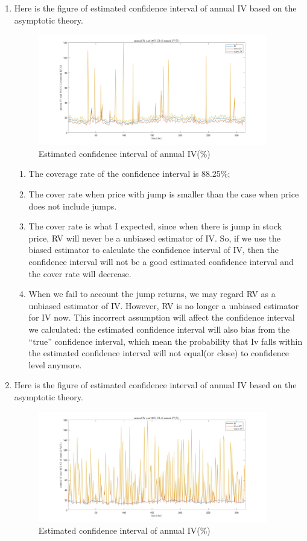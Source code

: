 \documentclass[12pt,letterpaper]{article}
\begin{document}
\begin{enumerate}[label=\textbf{(\Alph*)}]
\item Here is the figure of estimated confidence interval of annual IV based on the asymptotic theory.
\begin{figure}[H]
            \centering
            \includegraphics[width=10cm]{figures/p3_ex3_h.jpg}
            \caption{Estimated confidence interval of annual IV(\%)}
        \end{figure}
\begin{enumerate}[label=(\roman*)]
    \item The coverage rate of the confidence interval is 88.25\%;
    \item The cover rate when price with jump is smaller than the case when price does not include jumps.
    \item The cover rate is what I expected, since when there is jump in stock price, RV will never be a unbiased estimator of IV. So, if we use the biased estimator to calculate the confidence interval of IV, then the confidence interval will not be a good estimated confidence interval and the cover rate will decrease.
    \item When we fail to account the jump returns, we may regard RV as a unbiased estimator of IV. However, RV is no longer a unbiased estimator for IV now. This incorrect assumption will affect the confidence interval we calculated: the estimated confidence interval will also bias from the ``true'' confidence interval, which mean the probability that Iv falls within the estimated confidence interval will not equal(or close) to confidence level anymore.\\
    
\end{enumerate}

\item Here is the figure of estimated confidence interval of annual IV based on the asymptotic theory.
\begin{figure}[H]
            \centering
            \includegraphics[width=10cm]{figures/p3_ex3_i.jpg}
            \caption{Estimated confidence interval of annual IV(\%)}
            

\end{figure}
\end{enumerate}
\end{document}
